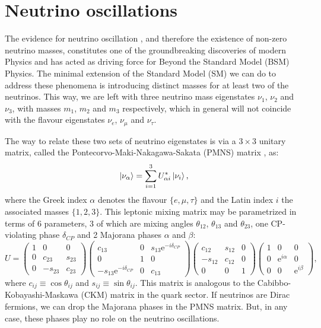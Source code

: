 \section{Neutrino oscillations}

The evidence for neutrino oscillation \cite{SuperKamiokande1998}, and therefore the existence of non-zero neutrino masses, constitutes one of the groundbreaking discoveries of modern Physics and has acted as driving force for Beyond the Standard Model (BSM) Physics. The minimal extension of the Standard Model (SM) we can do to address these phenomena is introducing distinct masses for at least two of the neutrinos. This way, we are left with three neutrino mass eigenstates $\nu_{1}$, $\nu_{2}$ and $\nu_{3}$, with masses $m_{1}$, $m_{2}$ and $m_{3}$ respectively, which in general will not coincide with the flavour eigenstates $\nu_{e}$, $\nu_{\mu}$ and $\nu_{\tau}$.

The way to relate these two sets of neutrino eigenstates is via a $3 \times 3$ unitary matrix, called the Pontecorvo-Maki-Nakagawa-Sakata (PMNS) matrix \cite{Pontecorvo1957, Maki1962}, as:
\begin{equation}\label{2.1}
\ket{\nu_{\alpha}} = \sum_{i=1}^{3} U^{*}_{\alpha i} \ket{\nu_{i}},
\end{equation}
where the Greek index $\alpha$ denotes the flavour $\{e,\mu,\tau\}$ and the Latin index $i$ the associated masses $\{1,2,3\}$. This leptonic mixing matrix may be parametrized in terms of 6 parameters, 3 of which are mixing angles $\theta_{12}$, $\theta_{13}$ and $\theta_{23}$, one CP-violating phase $\delta_{CP}$ and 2 Majorana phases $\alpha$ and $\beta$:
\begin{equation}\label{2.2}
U = \left(\begin{array}{ccc}1&0&0\\0&c_{23}&s_{23}\\0&-s_{23}&c_{23}\end{array}\right) \left(\begin{array}{ccc}c_{13}&0&s_{13} \mathrm{e}^{-i\delta_{CP}}\\0&1&0\\-s_{13} \mathrm{e}^{-i\delta_{CP}}&0&c_{13}\end{array}\right) \left(\begin{array}{ccc}c_{12}&s_{12}&0\\-s_{12}&c_{12}&0\\0&0&1\end{array}\right) \left(\begin{array}{ccc}1&0&0\\0&\mathrm{e}^{i\alpha}&0\\0&0&\mathrm{e}^{i\beta}\end{array}\right),
\end{equation}
where $c_{ij} \equiv \cos \theta_{ij}$ and $s_{ij} \equiv \sin \theta_{ij}$. This matrix is analogous to the Cabibbo-Kobayashi-Maskawa (CKM) matrix in the quark sector. If neutrinos are Dirac fermions, we can drop the Majorana phases in the PMNS matrix. But, in any case, these phases play no role on the neutrino oscillations.

